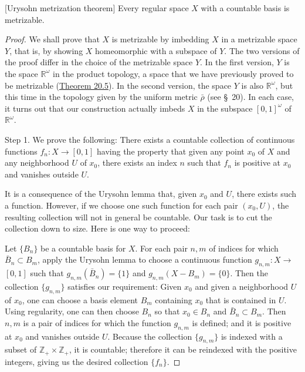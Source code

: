 \begin{theorem}
\label{thm:\thetheorem}[Urysohn metrization theorem]
 Every regular space \(X\) with a countable basis is metrizable.

\end{theorem}
\begin{proof}
 We shall prove that \(X\) is metrizable by imbedding \(X\) in a metrizable space \(Y\), that is, by showing \(X\) homeomorphic with a subspace of \(Y\). The two versions of the proof differ in the choice of the metrizable space \(Y\). In the first version, \(Y\) is the space \(\mathbb{R}^{\omega }\) in the product topology, a space that we have previously proved to be metrizable (\hyperref[thm:20.5]{Theorem 20.5}). In the second version, the space \(Y\) is also \(\mathbb{R}^{\omega }\), but this time in the topology given by the uniform metric \(\bar{\rho }\) (see \S\ 20). In each case, it turns out that our construction actually imbeds \(X\) in the subspace \({[ 0,1] }^{\omega }\) of \(\mathbb{R}^{\omega }\).

Step 1. We prove the following: There exists a countable collection of continuous functions \(f_{n} : X \rightarrow [ {0,1}]\) having the property that given any point \(x_{0}\) of \(X\) and any neighborhood \(U\) of \(x_{0}\), there exists an index \(n\) such that \(f_{n}\) is positive at \(x_{0}\) and vanishes outside \(U\).

It is a consequence of the Urysohn lemma that, given \(x_{0}\) and \(U\), there exists such a function. However, if we choose one such function for each pair \(( {x_{0},U})\), the resulting collection will not in general be countable. Our task is to cut the collection down to size. Here is one way to proceed:

Let \(\{ B_{n}\}\) be a countable basis for \(X\). For each pair \(n,m\) of indices for which \(\bar{B}_{n} \subset {B}_{m}\), apply the Urysohn lemma to choose a continuous function \(g_{n,m} : X \rightarrow\) \([ {0,1}]\) such that \(g_{n,m}( \bar{B}_{n}) = \{ 1\}\) and \(g_{n,m}( {X - B_{m}}) = \{ 0\}\). Then the collection \(\{ g_{n,m}\}\) satisfies our requirement: Given \(x_{0}\) and given a neighborhood \(U\) of \(x_{0}\), one can choose a basis element \(B_{m}\) containing \(x_{0}\) that is contained in \(U\). Using regularity, one can then choose \(B_{n}\) so that \(x_{0} \in {B}_{n}\) and \(\bar{B}_{n} \subset {B}_{m}\). Then \(n,m\) is a pair of indices for which the function \(g_{n,m}\) is defined; and it is positive at \(x_{0}\) and vanishes outside \(U\). Because the collection \(\{ g_{n,m}\}\) is indexed with a subset of \(\mathbb{Z}_{ + } \times {\mathbb{Z}}_{ + }\), it is countable; therefore it can be reindexed with the positive integers, giving us the desired collection \(\{ f_{n}\}\).


\end{proof}
